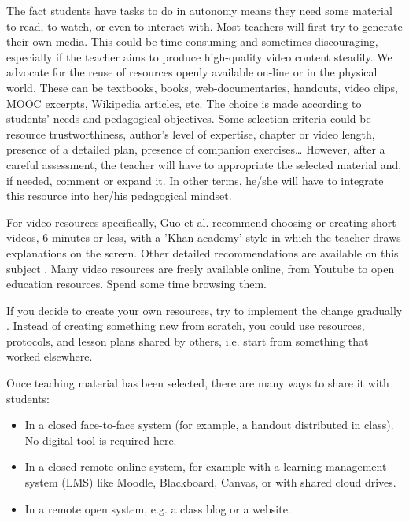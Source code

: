 \documentclass[10pt,letterpaper]{article}
\begin{document}
The fact students have tasks to do in autonomy means they need some material to read, to watch, or even to interact with. 
Most teachers will first try to generate their own media. This could be time-consuming and sometimes discouraging, 
especially if the teacher aims to produce high-quality video content steadily. We advocate for the reuse of resources 
openly available on-line or in the physical world. These can be textbooks, books, web-documentaries, handouts, video clips, 
MOOC excerpts, Wikipedia articles, etc. The choice is made according to students' needs and pedagogical objectives. 
Some selection criteria could be resource trustworthiness, author's level of expertise, chapter or video length, 
presence of a detailed plan, presence of companion exercises\ldots{} However, after a careful assessment, the teacher will 
have to appropriate the selected material and, if needed, comment or expand it. In other terms, he/she will have 
to integrate this resource into her/his pedagogical mindset.

For video resources specifically, Guo et al. \cite{guo_how_2014} recommend choosing or creating short videos, 6 minutes or less, 
with a 'Khan academy' style in which the teacher draws explanations on the screen.  Other detailed recommendations are available 
on this subject \cite{mayer_cambridge_2005}. Many video resources are freely available online, from Youtube to open education
resources. Spend some time browsing them.

If you decide to create your own resources, try to implement the change gradually \cite{lo_critical_2017}. 
Instead of creating something new from scratch, you could use resources, protocols, and lesson plans 
shared by others, i.e. start from something that worked elsewhere.

Once teaching material has been selected, there are many ways to share it with students:

\begin{itemize}

\item In a closed face-to-face system (for example, a handout distributed in class). 
No digital tool is required here.

\item In a closed remote online system, for example with a learning management system (LMS) like Moodle, Blackboard, Canvas, 
or with shared cloud drives.

\item In a remote open system, e.g. a class blog or a website.

\end{itemize}
\end{document}
